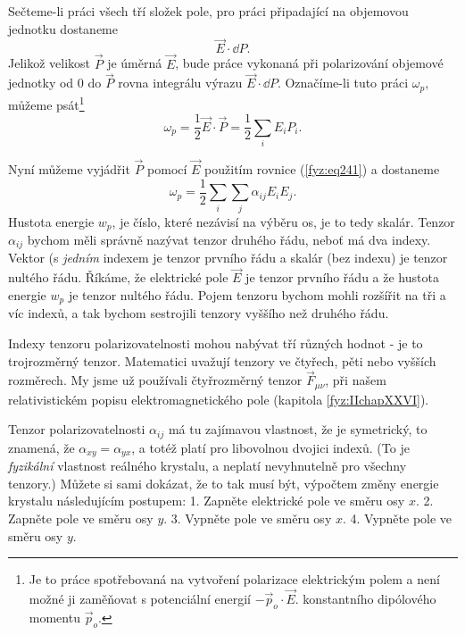     Sečteme-li práci všech tří složek pole, pro práci připadající na objemovou jednotku dostaneme
    \begin{equation*}
      \vec{E}\cdot\dd{P}.
    \end{equation*}
    Jelikož velikost \(\vec{P}\) je úměrná \(\vec{E}\), bude práce vykonaná při polarizování
    objemové jednotky od 0 do \(\vec{P}\) rovna integrálu výrazu \(\vec{E}\cdot\dd{P}\). Označíme-li
    tuto práci \(\omega_p\), můžeme psát\footnote{Je to práce spotřebovaná na vytvoření polarizace
    elektrickým polem a není možné ji zaměňovat s potenciální energií \(-\vec{p}_o\cdot\vec{E}\).
    konstantního dipólového momentu \(\vec{p}_o\).}
    \begin{equation}\label{fyz:eq242}
      \omega_p = \frac{1}{2}\vec{E}\cdot\vec{P} = \frac{1}{2}\sum_iE_iP_i.
    \end{equation}

    Nyní můžeme vyjádřit \(\vec{P}\) pomocí \(\vec{E}\) použitím rovnice (\ref{fyz:eq241}) a
    dostaneme
    \begin{equation}\label{fyz:eq243}
      \omega_p = \frac{1}{2}\sum_i\sum_j\alpha_{ij}E_iE_j.
    \end{equation}
    Hustota energie \(w_p\), je číslo, které nezávisí na výběru os, je to tedy skalár. Tenzor
    \(\alpha_{ij}\) bychom měli správně nazývat tenzor druhého řádu, neboť má dva indexy. Vektor (s
    \emph{jedním} indexem je tenzor prvního řádu a skalár (bez indexu) je tenzor nultého řádu.
    Říkáme, že elektrické pole \(\vec{E}\) je tenzor prvního řádu a že hustota energie \(w_p\) je
    tenzor nultého řádu. Pojem tenzoru bychom mohli rozšířit na tři a víc indexů, a tak bychom
    sestrojili tenzory vyššího než druhého řádu.

    Indexy tenzoru polarizovatelnosti mohou nabývat tří různých hodnot - je to trojrozměrný tenzor.
    Matematici uvažují tenzory ve čtyřech, pěti nebo vyšších rozměrech. My jsme už používali
    čtyřrozměrný tenzor \(\vec{F}_{\mu\nu}\), při našem relativistickém popisu elektromagnetického
    pole (kapitola \ref{fyz:IIchapXXVI}).


    Tenzor polarizovatelnosti \(\alpha_{ij}\) má tu zajímavou vlastnost, že je symetrický, to
    znamená, že \(\alpha_{xy} = \alpha_{yx}\), a totéž platí pro libovolnou dvojici indexů. (To je
    \emph{fyzikální} vlastnost reálného krystalu, a neplatí nevyhnutelně pro všechny tenzory.)
    Můžete si sami dokázat, že to tak musí být, výpočtem změny energie krystalu následujícím
    postupem: 1. Zapněte elektrické pole ve směru osy \(x\). 2. Zapněte pole ve směru osy \(y\). 3.
    Vypněte pole ve směru osy \(x\). 4. Vypněte pole ve směru osy \(y\).

